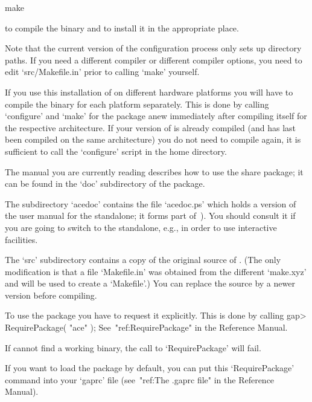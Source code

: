 \begintt
make
\endtt

to compile the binary and to install it in the appropriate place.

Note that the  current version of the configuration  process only sets
up  directory paths.  If you  need a  different compiler  or different
compiler options, you need  to edit `src/Makefile.in' prior to calling
`make' yourself.

If you use this installation of {\GAP} on different hardware platforms
you will have to compile the binary for each platform separately. This
is  done  by calling  `configure'  and  `make'  for the  package  anew
immediately   after  compiling  {\GAP}   itself  for   the  respective
architecture.  If your version of  {\GAP} is already compiled (and has
last  been compiled  on  the same  architecture)  you do  not need  to
compile {\GAP} again, it is  sufficient to call the `configure' script
in the {\GAP} home directory.

The manual you are currently reading describes how to use the {\ACE}
share package; it can be found in the `doc' subdirectory of the package.

The subdirectory `acedoc' contains the file `acedoc.ps' which holds a
version of the user manual for the {\ACE} standalone;
it forms part of~\cite{HR99a}).
You should consult it if you are going to switch to the {\ACE}
standalone, e.g., in order to use interactive facilities.

The  `src' subdirectory  contains a  copy  of the  original source  of
{\ACE}.  (The  only modification  is  that  a  file `Makefile.in'  was
obtained from  the different `make.xyz' and  will be used  to create a
`Makefile'.)  You  can replace  the source by  a newer  version before
compiling.



To use  the {\ACE} package you  have to request it  explicitly. This is
done by calling
\begintt
gap> RequirePackage( "ace" );
\endtt
See~"ref:RequirePackage" in the {\GAP} Reference Manual.

If {\GAP} cannot find a working binary, the call to `RequirePackage' will
fail.

If you want to load the {\ACE} package by default, you can put this
`RequirePackage' command into your `gaprc' file
(see~"ref:The .gaprc file" in the {\GAP} Reference Manual).





